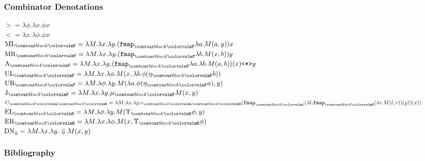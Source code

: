 \documentclass[math, english, info]{beamercours}
\begin{document}
\begin{frame}
	\frametitle{Combinator Denotations}
	\scriptsize
	\centering
	$	>                    = \lambda \phi. \lambda x. \phi x $\\[1.5ex]
	$ <                    = \lambda x. \lambda \phi. \phi x $\\[1.5ex]
	$ \combML_{\f{F}}      = \lambda M. \lambda x. \lambda y. (\fmap_{\f{F}} \lambda a. M(a, y)) x $\\[1.5ex]
	$ \combMR_{\f{F}}      = \lambda M. \lambda x. \lambda y. (\fmap_{\f{F}} \lambda b. M(x, b)) y $\\[1.5ex]
	$	\combA_{\f{F}}       = \lambda M. \lambda x. \lambda y. (\fmap_{\f{F}}\lambda a. \lambda b. M(a, b))(x) \texttt{<*>} y $\\[1.5ex]
	$	\combUL_{\f{F}}      = \lambda M. \lambda x. \lambda \phi. M(x, \lambda b. \phi(\eta_{\f{F}} b))$\\[1.5ex]
	$	\combUR_{\f{F}}      = \lambda M. \lambda \phi. \lambda y. M(\lambda a. \phi(\eta_{\f{F}} a),y) $\\[1.5ex]
	$ \combJ_{\f{F}}       = \lambda M. \lambda x. \lambda y. \mu_{\f{F}} M(x, y) $\\[1.5ex]
	$\combC_{\f{L}\f{R}}  = \lambda M. \lambda x. \lambda y. \epsilon_{\f{L}\f{R}}(\fmap_{\f{L}}(\lambda l. \fmap_{\f{R}}(\lambda r. M(l, r))(y)) (x))$\\[1.5ex]
	$	\combEL_{\f{R}}      = \lambda M. \lambda \phi. \lambda y. M(\Upsilon_{\f{R}} \phi, y)$\\[1.5ex]
	$	\combER_{\f{R}}      = \lambda M. \lambda x. \lambda \phi. M(x, \Upsilon_{\f{R}} \phi)$\\[1.5ex]
	$	\text{DN}_{\Downarrow} = \lambda M. \lambda x. \lambda y. \Downarrow M(x, y)$
\end{frame}

\begin{frame}[allowframebreaks]
	\frametitle{Bibliography}
	\printbibliography
\end{frame}
\end{document}
